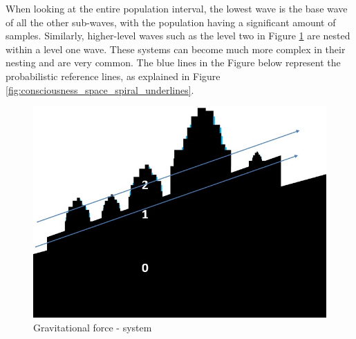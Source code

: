 When looking at the entire population interval, the lowest wave is the base wave of all the other sub-waves, with the population having a significant amount of samples.  Similarly, higher-level waves such as the level two in Figure \ref{fig:consciousness_gravitational_force_system} are nested within a level one wave. These systems can become much more complex in their nesting and are very common. The blue lines in the Figure below represent the probabilistic reference lines, as explained in Figure \ref{fig:consciousness_space_spiral_underlines}.
	\begin{figure}[H]
	\caption{Gravitational force - system}
	\label{fig:consciousness_gravitational_force_system}
	\centering
	\includegraphics[scale=.4]{sections/images/consciousness_gravitational_force_system.jpg}
	\end{figure}
	
